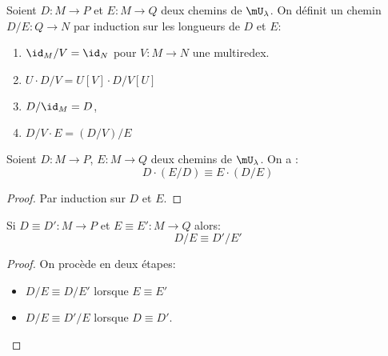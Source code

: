 \documentclass[math, info]{cours}
\begin{document}
Soient $D: M \to P$ et $E: M \to Q$ deux chemins de $\mU_{\lambda}$.
On définit un chemin $D / E : Q \to N$ par induction sur les longueurs de $D$ et $E$:
\begin{enumerate}
	\item $\id_{M} / V = \id_{N}$ pour $V: M \to N$ une multiredex.
	\item $U \cdot D / V = U[V] \cdot D / V[U]$
	\item $D / \id_{M} = D$,
	\item $D / V\cdot E = (D / V) / E$
\end{enumerate}

\begin{proposition}
	Soient $D: M \to P$, $E: M \to Q$ deux chemins de $\mU_{\lambda}$.
	On a :
	\begin{equation*}
		D \cdot (E/D) \equiv E\cdot(D/E)
	\end{equation*}
	\label{prop:equivresiduschemins}
\end{proposition}
\begin{proof}
	Par induction sur $D$ et $E$.
\end{proof}

\begin{proposition}
Si $D \equiv D' : M \to P$ et $E \equiv E': M \to Q$ alors:
\begin{equation*}
	D / E \equiv D' / E'
\end{equation*}
\end{proposition}
\begin{proof}
	On procède en deux étapes:
	\begin{itemize}
		\item $D / E \equiv D / E'$ lorsque $E \equiv E'$
		\item $D / E \equiv D' / E$ lorsque $D \equiv D'$.
	\end{itemize}
\end{proof}
\end{document}

